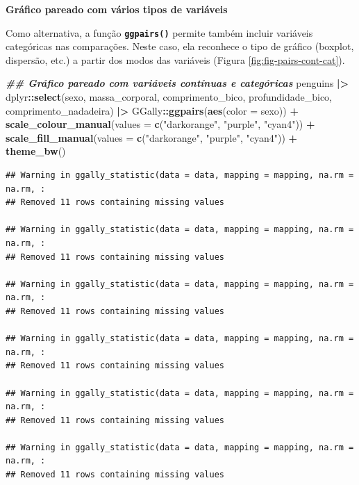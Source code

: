 \documentclass[
]{article}
\newenvironment{Shaded}{\begin{snugshade}}{\end{snugshade}}
\newcommand{\AttributeTok}[1]{\textcolor[rgb]{0.13,0.29,0.53}{#1}}
\newcommand{\DocumentationTok}[1]{\textcolor[rgb]{0.56,0.35,0.01}{\textbf{\textit{#1}}}}
\newcommand{\FunctionTok}[1]{\textcolor[rgb]{0.13,0.29,0.53}{\textbf{#1}}}
\newcommand{\NormalTok}[1]{#1}
\newcommand{\SpecialCharTok}[1]{\textcolor[rgb]{0.81,0.36,0.00}{\textbf{#1}}}
\newcommand{\StringTok}[1]{\textcolor[rgb]{0.31,0.60,0.02}{#1}}
\begin{document}
\textbf{Gráfico pareado com vários tipos de variáveis}

Como alternativa, a função \textbf{\texttt{ggpairs()}} permite também incluir variáveis categóricas nas comparações. Neste caso, ela reconhece o tipo de gráfico (boxplot, dispersão, etc.) a partir dos modos das variáveis (Figura \ref{fig:fig-pairs-cont-cat}).

\begin{Shaded}
\begin{Highlighting}[]
\DocumentationTok{\#\# Gráfico pareado com variáveis contínuas e categóricas}
\NormalTok{penguins }\SpecialCharTok{|\textgreater{}}
\NormalTok{    dplyr}\SpecialCharTok{::}\FunctionTok{select}\NormalTok{(sexo, massa\_corporal, comprimento\_bico, profundidade\_bico, comprimento\_nadadeira) }\SpecialCharTok{|\textgreater{}}
\NormalTok{    GGally}\SpecialCharTok{::}\FunctionTok{ggpairs}\NormalTok{(}\FunctionTok{aes}\NormalTok{(}\AttributeTok{color =}\NormalTok{ sexo)) }\SpecialCharTok{+}
    \FunctionTok{scale\_colour\_manual}\NormalTok{(}\AttributeTok{values =} \FunctionTok{c}\NormalTok{(}\StringTok{"darkorange"}\NormalTok{, }\StringTok{"purple"}\NormalTok{, }\StringTok{"cyan4"}\NormalTok{)) }\SpecialCharTok{+}
    \FunctionTok{scale\_fill\_manual}\NormalTok{(}\AttributeTok{values =} \FunctionTok{c}\NormalTok{(}\StringTok{"darkorange"}\NormalTok{, }\StringTok{"purple"}\NormalTok{, }\StringTok{"cyan4"}\NormalTok{)) }\SpecialCharTok{+}
    \FunctionTok{theme\_bw}\NormalTok{()}
\end{Highlighting}
\end{Shaded}

\begin{verbatim}
## Warning in ggally_statistic(data = data, mapping = mapping, na.rm = na.rm, :
## Removed 11 rows containing missing values

## Warning in ggally_statistic(data = data, mapping = mapping, na.rm = na.rm, :
## Removed 11 rows containing missing values

## Warning in ggally_statistic(data = data, mapping = mapping, na.rm = na.rm, :
## Removed 11 rows containing missing values

## Warning in ggally_statistic(data = data, mapping = mapping, na.rm = na.rm, :
## Removed 11 rows containing missing values

## Warning in ggally_statistic(data = data, mapping = mapping, na.rm = na.rm, :
## Removed 11 rows containing missing values

## Warning in ggally_statistic(data = data, mapping = mapping, na.rm = na.rm, :
## Removed 11 rows containing missing values
\end{verbatim}
\end{document}
